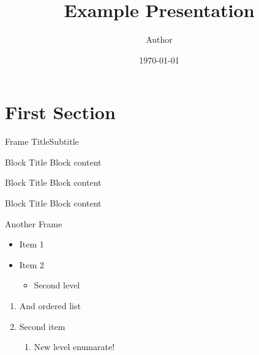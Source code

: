 \documentclass[aspectratio=1610]{beamer}
\title{Example Presentation}
\author{Author}
\date{\today}
\begin{document}
\startpage
\begin{frame}[noframenumbering]

  \maketitle

\end{frame}


\normalpage
\section{First Section}
\begin{frame}{Frame Title}{Subtitle}
\begin{block}{Block Title}
    Block content
\end{block}
\begin{alertblock}{Block Title}
    Block content
\end{alertblock}

\begin{example}{Block Title}
    Block content
\end{example}
\end{frame}

\begin{frame}{Another Frame}
\begin{itemize}
    \item Item 1
    \item Item 2
    \begin{itemize}
        \item Second level
    \end{itemize}
\end{itemize}

\begin{enumerate}
    \item And ordered list
    \item Second item
    \begin{enumerate}
        \item New level enumarate!
    \end{enumerate}
\end{enumerate}
\end{frame}
\end{document}
